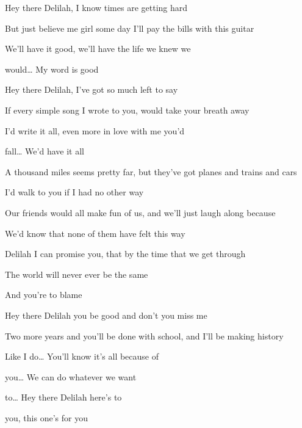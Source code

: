 \begin{song}
\bigskip

 Hey there Delilah, I know times are getting hard \par
But just believe me girl some day I'll pay the bills with this guitar \par
We'll have it good,  we'll have the life we knew we \par
{}would… My word is good \par

\bigskip

 Hey there Delilah, I've got so much left to say \par
If every simple song I wrote to you, would take your breath away \par
I'd write it all, even more in love with me you'd \par
{}fall… We'd have it all \par

\bigskip

\Chorus

\bigskip

A thousand miles seems pretty far, but they've got planes and trains and cars \par
I'd walk to you if I had no other way \par
Our friends would all make fun of us, and we'll just laugh along because  \par
We'd know that none of them have felt this way \par
Delilah I can promise you, that by the time that we get through \par
The world will never ever be the same \par
And you're to blame \par

\bigskip

 Hey there Delilah you be good and don't you miss me \par
Two more years and you'll be done with school, and I'll be making history \par
Like I do…  You'll know it's all because of \par
{}you… We can do whatever we want \par
{}to…  Hey there Delilah here's to \par
{}you, this one’s for you \par

\bigskip

\Chorus

\end{song}
